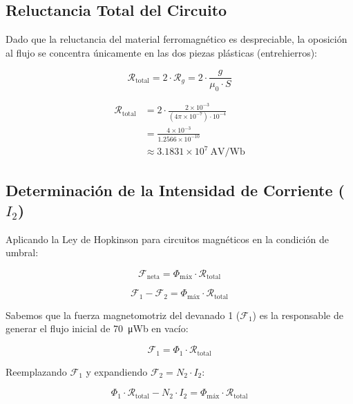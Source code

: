 \documentclass[12pt,a4paper]{article}
\begin{document}
\subsection{Reluctancia Total del Circuito}

Dado que la reluctancia del material ferromagnético es despreciable, la oposición al flujo se concentra únicamente en las dos piezas plásticas (entrehierros):

\begin{equation}
    \mathcal{R}_{\text{total}} = 2 \cdot \mathcal{R}_g = 2 \cdot \frac{g}{\mu_0 \cdot S}
\end{equation}

\begin{align}
    \mathcal{R}_{\text{total}}
    &= 2 \cdot \frac{2 \times 10^{-3}}{(4\pi \times 10^{-7}) \cdot 10^{-4}} \nonumber \\
    &= \frac{4 \times 10^{-3}}{1.2566 \times 10^{-10}} \nonumber \\
    &\approx 3.1831 \times 10^{7}\ \si{\ampere\volt\per\weber}
\end{align}

\subsection{Determinación de la Intensidad de Corriente ($I_2$)}

Aplicando la Ley de Hopkinson para circuitos magnéticos en la condición de umbral:

\begin{equation}
    \mathcal{F}_{\text{neta}} = \Phi_{\text{máx}} \cdot \mathcal{R}_{\text{total}}
\end{equation}

\begin{equation}
    \mathcal{F}_1 - \mathcal{F}_2 = \Phi_{\text{máx}} \cdot \mathcal{R}_{\text{total}}
\end{equation}

Sabemos que la fuerza magnetomotriz del devanado 1 ($\mathcal{F}_1$) es la responsable de generar el flujo inicial de \SI{70}{\micro\weber} en vacío:

\begin{equation}
    \mathcal{F}_1 = \Phi_1 \cdot \mathcal{R}_{\text{total}}
\end{equation}

Reemplazando $\mathcal{F}_1$ y expandiendo $\mathcal{F}_2 = N_2 \cdot I_2$:

\begin{equation}
    \Phi_1 \cdot \mathcal{R}_{\text{total}} - N_2 \cdot I_2 = \Phi_{\text{máx}} \cdot \mathcal{R}_{\text{total}}
\end{equation}
\end{document}
